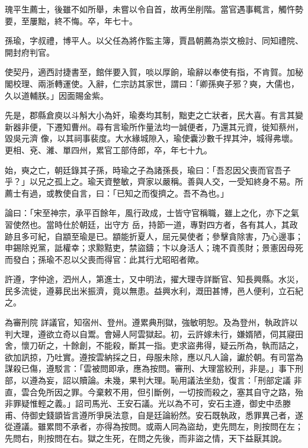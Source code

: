\begin{pinyinscope}
 瑰平生薦士，後雖不如所舉，未嘗以令自首，故再坐削階。當官遇事輒言，觸忤勢要，至屢黜，終不悔。卒，年七十。



 孫瑜，字叔禮，博平人。以父任為將作監主簿，賈昌朝薦為崇文檢討、同知禮院、開封府判官。



 使契丹，適西討捷書至，館伴要入賀，啖以厚餉，瑜辭以奉使有指，不肯賀。加秘閣校理、兩浙轉運使。入辭，仁宗訪其家世，謂曰：「卿孫奭子邪？奭，大儒也，久以道輔朕。」因面賜金紫。



 先是，郡縣倉庾以斗斛大小為奸，瑜奏均其制，黜吏之亡狀者，民大喜。有言其變新器非便，下遷知曹州。尋有言瑜所作量法均一誠便者，乃還其元資，徙知蔡州，毀吳元濟
 像，以其祠事裴度。大水緣城隙入，瑜使囊沙數千捍其沖，城得弗壞。更相、兗、濰、單四州，累官工部侍郎，卒，年七十九。



 始，奭之亡，朝廷錄其子孫，時瑜之子為諸孫長，瑜曰：「吾忍因父喪而官吾子乎？」以兄之孤上之。瑜天資整敏，齊家以嚴稱。善與人交，一受知終身不易。所薦士有過，或教使自言，曰：「已知之而復擠之。吾不為也。」



 論曰：「宋至神宗，承平百餘年，風行政成，士皆守官稱職，雖上之化，亦下之氣習使然也。當時仕於朝廷，出守方
 岳，持節一道，專對四方者，各有其人，其政跡且多可紀，自顓至瑜是已。顓能折夏人，屈元昊使者；參擊貪除害，乃心邊事；申錫除兇黨，詆權幸；求黥黠吏，禁盜鑄；卞以身活人；瑰不貢羨財；景憲因母死而發白；孫瑜不忍以父喪而得官：此其行尤昭昭者歟。



 許遵，字仲途，泗州人，第進士，又中明法，擢大理寺詳斷官、知長興縣。水災，民多流徙，遵募民出米振濟，竟以無患。益興水利，溉田甚博，邑人便利，立石紀之。



 為審刑院
 詳議官，知宿州、登州。遵累典刑獄，強敏明恕。及為登州，執政許以判大理，遵欲立奇以自鬻。會婦人阿雲獄起。初，云許嫁未行，嫌婿陋，伺其寢田舍，懷刀斫之，十餘創，不能殺，斷其一指。吏求盜弗得，疑云所為，執而詰之，欲加訊掠，乃吐實。遵按雲納採之日，母服未除，應以凡人論，讞於朝。有司當為謀殺已傷，遵駁言：「雲被問即承，應為按問。審刑、大理當絞刑，非是。」事下刑部，以遵為妄，詔以贖論。未幾，果判大理。恥用議法坐劾，復言：「刑部定議
 非直，雲合免所因之罪。今棄敕不用，但引斷例，一切按而殺之，塞其自守之路，殆非罪疑惟輕之義。」詔司馬光、王安石議。光以為不可，安石主遵，御史中丞滕甫、侍御史錢顗皆言遵所爭戾法意，自是廷論紛然。安石既執政，悉罪異己者，遂從遵議。雖累問不承者，亦得為按問。或兩人同為盜劫，吏先問左，則按問在左；先問右，則按問在右。獄之生死，在問之先後，而非盜之情，天下益厭其說。




\end{pinyinscope}
